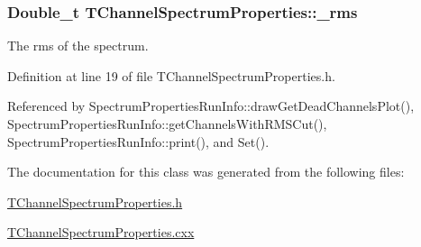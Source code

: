 \hypertarget{class_t_channel_spectrum_properties_a1eb2a743128d8069e0e962dfaaff3367}{
\subsubsection[{\-\_\-rms}]{\setlength{\rightskip}{0pt plus 5cm}Double\-\_\-t T\-Channel\-Spectrum\-Properties\-::\-\_\-rms}}\label{class_t_channel_spectrum_properties_a1eb2a743128d8069e0e962dfaaff3367}


The rms of the spectrum. 



Definition at line 19 of file T\-Channel\-Spectrum\-Properties.\-h.



Referenced by Spectrum\-Properties\-Run\-Info\-::draw\-Get\-Dead\-Channels\-Plot(), Spectrum\-Properties\-Run\-Info\-::get\-Channels\-With\-R\-M\-S\-Cut(), Spectrum\-Properties\-Run\-Info\-::print(), and Set().



The documentation for this class was generated from the following files\-:\begin{DoxyCompactItemize}
\item 
\hyperlink{_t_channel_spectrum_properties_8h}{T\-Channel\-Spectrum\-Properties.\-h}\item 
\hyperlink{_t_channel_spectrum_properties_8cxx}{T\-Channel\-Spectrum\-Properties.\-cxx}\end{DoxyCompactItemize}
